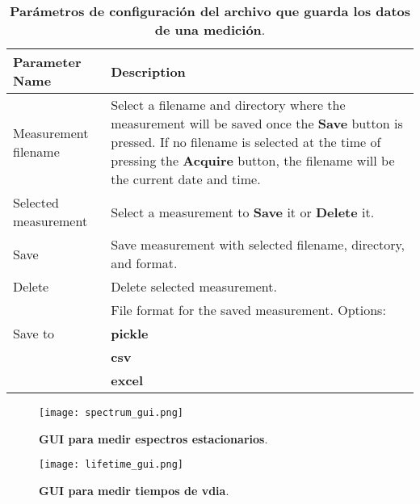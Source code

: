 \begin{table}[htbp]
    \centering
    \begin{tabularx}{\textwidth}{|l|X|}
        \hline
        \textbf{Parameter Name} & \textbf{Description} \\
        \hline
        Measurement filename & Select a filename and directory where the measurement will be saved once the \textbf{Save} button is pressed. If no filename is selected at the time of pressing the \textbf{Acquire} button, the filename will be the current date and time. \\
        \hline
        Selected measurement & Select a measurement to \textbf{Save} it or \textbf{Delete} it. \\
        \hline
        Save & Save measurement with selected filename, directory, and format. \\
        \hline
        Delete & Delete selected measurement. \\
        \hline
        \multirow{3}{3cm}{Save to} & File format for the saved measurement. Options: \\
        \cline{2-2}
        & \textbf{pickle} \\
        \cline{2-2}
        & \textbf{csv} \\
        \cline{2-2}
        & \textbf{excel} \\
        \hline
    \end{tabularx}
    \caption{\textbf{Parámetros de configuración del archivo que guarda los datos de una medición}.}
    \label{tab:file_parameters}
\end{table}

\begin{figure}
    \centering
    \texttt{[image: spectrum\_gui.png]}
    \caption{\textbf{GUI para medir espectros estacionarios}.}
    \label{fig:spectrum_gui}
\end{figure}

\begin{figure}
    \centering
    \texttt{[image: lifetime\_gui.png]}
    \caption{\textbf{GUI para medir tiempos de vdia}.}
    \label{fig:lifetime_gui}
\end{figure}

